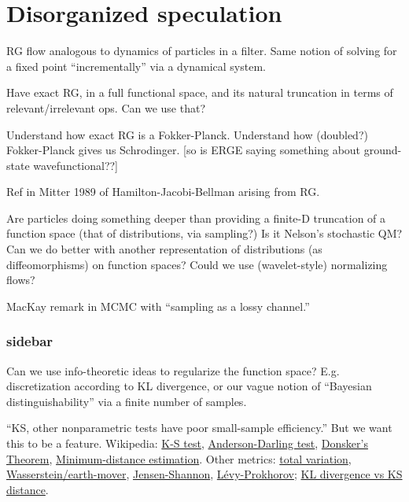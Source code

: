 \documentclass[notitlepage,openany,11pt]{report}
\theoremstyle{plain}%
\numberwithin{equation}{section}
\begin{document}
\section{Disorganized speculation}
RG flow analogous to dynamics of particles in a filter. Same notion of solving for a fixed point ``incrementally'' via a dynamical system.

Have exact RG, in a full functional space, and its natural truncation in terms of relevant/irrelevant ops. Can we use that?

Understand how exact RG is a Fokker-Planck. Understand how (doubled?) Fokker-Planck gives us Schrodinger. [so is ERGE saying something about ground-state wavefunctional??]

Ref in Mitter 1989 of Hamilton-Jacobi-Bellman arising from RG.




Are particles doing something deeper than providing a finite-D truncation of a function space (that of distributions, via sampling?) Is it Nelson's stochastic QM?
Can we do better with another representation of distributions (as diffeomorphisms) on function spaces? Could we use (wavelet-style) normalizing flows?

MacKay remark in MCMC with ``sampling as a lossy channel.''

\subsubsection{sidebar}
Can we use info-theoretic ideas to regularize the function space? E.g. discretization according to KL divergence, or our vague notion of ``Bayesian distinguishability'' via a finite number of samples.

``KS, other nonparametric tests have poor small-sample efficiency.'' But we want this to be a feature.
Wikipedia: \href{https://en.wikipedia.org/wiki/Kolmogorov\%E2\%80\%93Smirnov_test}{K-S test}, 
\href{https://en.wikipedia.org/wiki/Anderson\%E2\%80\%93Darling_test}{Anderson-Darling test},
\href{https://en.wikipedia.org/wiki/Donsker\%27s_theorem}{Donsker's Theorem},
\href{https://en.wikipedia.org/wiki/Minimum-distance_estimation}{Minimum-distance estimation}.
Other metrics: \href{https://en.wikipedia.org/wiki/Total_variation_distance_of_probability_measures}{total variation},
\href{https://en.wikipedia.org/wiki/Wasserstein_metric}{Wasserstein/earth-mover},
\href{https://en.wikipedia.org/wiki/Jensen\%E2\%80\%93Shannon_divergence}{Jensen-Shannon},
\href{https://en.wikipedia.org/wiki/L\%C3\%A9vy\%E2\%80\%93Prokhorov_metric}{L\'{e}vy-Prokhorov}; \href{https://stats.stackexchange.com/questions/9311/kullback-leibler-vs-kolmogorov-smirnov-distance?rq=1}{KL divergence vs KS distance}.
\end{document}
